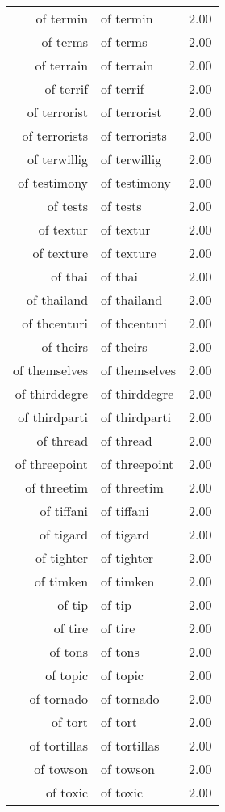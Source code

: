 \begin{table}[ht]
\begin{tabular}{rlr}
  of termin & of termin & 2.00 \\ 
  of terms & of terms & 2.00 \\ 
  of terrain & of terrain & 2.00 \\ 
  of terrif & of terrif & 2.00 \\ 
  of terrorist & of terrorist & 2.00 \\ 
  of terrorists & of terrorists & 2.00 \\ 
  of terwillig & of terwillig & 2.00 \\ 
  of testimony & of testimony & 2.00 \\ 
  of tests & of tests & 2.00 \\ 
  of textur & of textur & 2.00 \\ 
  of texture & of texture & 2.00 \\ 
  of thai & of thai & 2.00 \\ 
  of thailand & of thailand & 2.00 \\ 
  of thcenturi & of thcenturi & 2.00 \\ 
  of theirs & of theirs & 2.00 \\ 
  of themselves & of themselves & 2.00 \\ 
  of thirddegre & of thirddegre & 2.00 \\ 
  of thirdparti & of thirdparti & 2.00 \\ 
  of thread & of thread & 2.00 \\ 
  of threepoint & of threepoint & 2.00 \\ 
  of threetim & of threetim & 2.00 \\ 
  of tiffani & of tiffani & 2.00 \\ 
  of tigard & of tigard & 2.00 \\ 
  of tighter & of tighter & 2.00 \\ 
  of timken & of timken & 2.00 \\ 
  of tip & of tip & 2.00 \\ 
  of tire & of tire & 2.00 \\ 
  of tons & of tons & 2.00 \\ 
  of topic & of topic & 2.00 \\ 
  of tornado & of tornado & 2.00 \\ 
  of tort & of tort & 2.00 \\ 
  of tortillas & of tortillas & 2.00 \\ 
  of towson & of towson & 2.00 \\ 
  of toxic & of toxic & 2.00 \\ 

\end{tabular}
\end{table}
